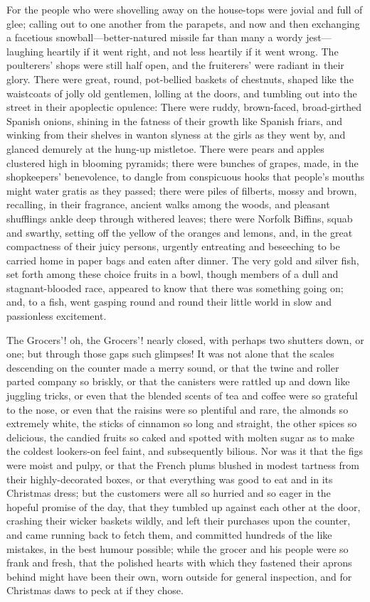 \documentclass[paper=5.5in:8.5in,BCOR=15mm,twoside,DIV=15,headinclude=off,12pt,chapterprefix=off,openany,headings=huge]{scrbook} %
\begin{document}
For the people who were shovelling away on the house-tops were jovial and full of glee; calling out to one another from the parapets, and now and then exchanging a facetious snowball—better-natured missile far than many a wordy jest—laughing heartily if it went right, and not less heartily if it went wrong. The poulterers' shops were still half open, and the fruiterers' were radiant in their glory. There were great, round, pot-bellied baskets of chestnuts, shaped like the waistcoats of jolly old gentlemen, lolling at the doors, and tumbling out into the street in their apoplectic opulence: There were ruddy, brown-faced, broad-girthed Spanish onions, shining in the fatness of their growth like Spanish friars, and winking from their shelves in wanton slyness at the girls as they went by, and glanced demurely at the hung-up mistletoe. There were pears and apples clustered high in blooming pyramids; there were bunches of grapes, made, in the shopkeepers' benevolence, to dangle from conspicuous hooks that people's mouths might water gratis as they passed; there were piles of filberts, mossy and brown, recalling, in their fragrance, ancient walks among the woods, and pleasant shufflings ankle deep through withered leaves; there were Norfolk Biffins, squab and swarthy, setting off the yellow of the oranges and lemons, and, in the great compactness of their juicy persons, urgently entreating and beseeching to be carried home in paper bags and eaten after dinner. The very gold and silver fish, set forth among these choice fruits in a bowl, though members of a dull and stagnant-blooded race, appeared to know that there was something going on; and, to a fish, went gasping round and round their little world in slow and passionless excitement.

The Grocers'! oh, the Grocers'! nearly closed, with perhaps two shutters down, or one; but through those gaps such glimpses! It was not alone that the scales descending on the counter made a merry sound, or that the twine and roller parted company so briskly, or that the canisters were rattled up and down like juggling tricks, or even that the blended scents of tea and coffee were so grateful to the nose, or even that the raisins were so plentiful and rare, the almonds so extremely white, the sticks of cinnamon so long and straight, the other spices so delicious, the candied fruits so caked and spotted with molten sugar as to make the coldest lookers-on feel faint, and subsequently bilious. Nor was it that the figs were moist and pulpy, or that the French plums blushed in modest tartness from their highly-decorated boxes, or that everything was good to eat and in its Christmas dress; but the customers were all so hurried and so eager in the hopeful promise of the day, that they tumbled up against each other at the door, crashing their wicker baskets wildly, and left their purchases upon the counter, and came running back to fetch them, and committed hundreds of the like mistakes, in the best humour possible; while the grocer and his people were so frank and fresh, that the polished hearts with which they fastened their aprons behind might have been their own, worn outside for general inspection, and for Christmas daws to peck at if they chose.
\end{document}
